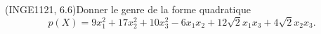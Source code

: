 

\begin{exercice}\label{exoINGE1121La0015}

	(INGE1121, 6.6)Donner le genre de la forme quadratique
	\begin{equation}
		p(X)=9x_1^2+17x_2^2+10x_3^2-6x_1x_2+12\sqrt{2}x_1x_3+4\sqrt{2}x_2x_3.
	\end{equation}

\end{exercice}
